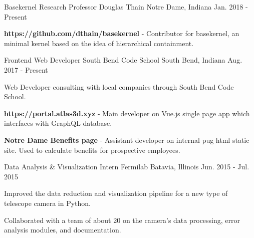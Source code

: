 \begin{cventries}
  \cventry
    {Basekernel Research}
    {Professor Douglas Thain}
    {Notre Dame, Indiana}
    {Jan. 2018 - Present}
    {
      \begin{cvitems}
        \item {{\bf https://github.com/dthain/basekernel} - Contributor for basekernel, an minimal kernel based on the idea of hierarchical containment.}
      \end{cvitems}
    }
  \cventry
    {Frontend Web Developer}
    {South Bend Code School}
    {South Bend, Indiana}
    {Aug. 2017 - Present}
    {
      \begin{cvitems}
        \item {Web Developer consulting with local companies through South Bend Code School.}
        \item {{\bf https://portal.atlas3d.xyz} - Main developer on Vue.js single page app which interfaces with GraphQL database.}
        \item {{\bf Notre Dame Benefits page} - Assistant developer on internal pug html static site.  Used to calculate benefits for prospective employees.}
      \end{cvitems}
    }
\iffalse
  \cventry
    {Donation Facilitator}
    {Notre Dame Alumni Center}
    {Notre Dame, Indiana}
    {Sep. 2016 - May. 2017}
    {
      \begin{cvitems}
        \item {Facilitated financial contributions to the University for various causes and campaigns.}
        \item {Exceeded the average amount of donations by more than 17\% in every report.}
      \end{cvitems}
    }
\fi
  \cventry
    {Data Analysis \& Visualization Intern}
    {Fermilab}
    {Batavia, Illinois}
    {Jun. 2015 - Jul. 2015}
    {
      \begin{cvitems}
        \item {Improved the data reduction and visualization pipeline for a new type
of telescope camera in Python.}
        \item {Collaborated with a team of about 20 on the camera’s data processing, error analysis modules, and documentation.}
      \end{cvitems}
    }
\end{cventries}
